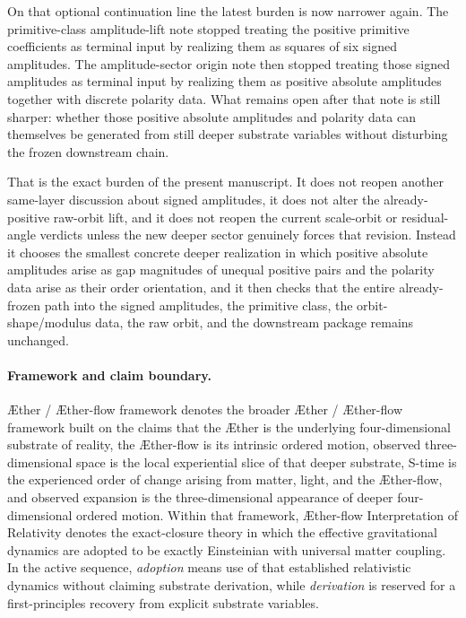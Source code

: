 \documentclass[11pt]{article}
\newcommand{\Aether}{\AE{}ther}
\newcommand{\Aflow}{\AE{}ther-flow}
\newcommand{\TheoryName}{\Aflow{} Interpretation of Relativity}
\newcommand{\TheoryProgram}{\Aether{} / \Aflow{} framework}
\begin{document}
On that optional continuation line the latest burden is now narrower again. The primitive-class amplitude-lift note stopped treating the positive primitive coefficients as terminal input by realizing them as squares of six signed amplitudes. The amplitude-sector origin note then stopped treating those signed amplitudes as terminal input by realizing them as positive absolute amplitudes together with discrete polarity data. What remains open after that note is still sharper: whether those positive absolute amplitudes and polarity data can themselves be generated from still deeper substrate variables without disturbing the frozen downstream chain.

That is the exact burden of the present manuscript. It does not reopen another same-layer discussion about signed amplitudes, it does not alter the already-positive raw-orbit lift, and it does not reopen the current scale-orbit or residual-angle verdicts unless the new deeper sector genuinely forces that revision. Instead it chooses the smallest concrete deeper realization in which positive absolute amplitudes arise as gap magnitudes of unequal positive pairs and the polarity data arise as their order orientation, and it then checks that the entire already-frozen path into the signed amplitudes, the primitive class, the orbit-shape/modulus data, the raw orbit, and the downstream package remains unchanged.

\paragraph{Framework and claim boundary.}
\TheoryProgram{} denotes the broader \Aether{} / \Aflow{} framework built on the claims that the \Aether{} is the underlying four-dimensional substrate of reality, the \Aflow{} is its intrinsic ordered motion, observed three-dimensional space is the local experiential slice of that deeper substrate, S-time is the experienced order of change arising from matter, light, and the \Aflow{}, and observed expansion is the three-dimensional appearance of deeper four-dimensional ordered motion. Within that framework, \TheoryName{} denotes the exact-closure theory in which the effective gravitational dynamics are adopted to be exactly Einsteinian with universal matter coupling. In the active sequence, \emph{adoption} means use of that established relativistic dynamics without claiming substrate derivation, while \emph{derivation} is reserved for a first-principles recovery from explicit substrate variables.
\end{document}
